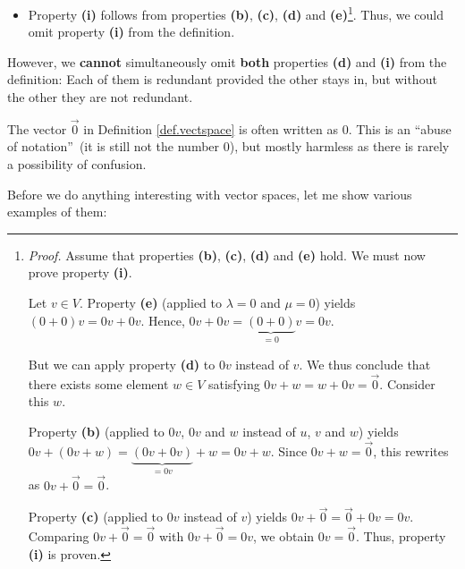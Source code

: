 \documentclass[numbers=enddot,12pt,final,onecolumn,notitlepage]{scrartcl}%
\theoremstyle{definition}
\begin{document}
\begin{itemize}
\item Property \textbf{(i)} follows from properties \textbf{(b)},
\textbf{(c)}, \textbf{(d)} and \textbf{(e)}\footnote{\textit{Proof.} Assume
that properties \textbf{(b)}, \textbf{(c)}, \textbf{(d)} and \textbf{(e)}
hold. We must now prove property \textbf{(i)}.
\par
Let $v\in V$. Property \textbf{(e)} (applied to $\lambda=0$ and $\mu=0$)
yields $\left(  0+0\right)  v=0v+0v$. Hence, $0v+0v=\underbrace{\left(
0+0\right)  }_{=0}v=0v$.
\par
But we can apply property \textbf{(d)} to $0v$ instead of $v$. We thus
conclude that there exists some element $w\in V$ satisfying
$0v+w=w+0v=\overrightarrow{0}$. Consider this $w$.
\par
Property \textbf{(b)} (applied to $0v$, $0v$ and $w$ instead of $u$, $v$ and
$w$) yields $0v+\left(  0v+w\right)  =\underbrace{\left(  0v+0v\right)
}_{=0v}+w=0v+w$. Since $0v+w=\overrightarrow{0}$, this rewrites as
$0v+\overrightarrow{0}=\overrightarrow{0}$.
\par
Property \textbf{(c)} (applied to $0v$ instead of $v$) yields
$0v+\overrightarrow{0}=\overrightarrow{0}+0v=0v$. Comparing
$0v+\overrightarrow{0}=\overrightarrow{0}$ with $0v+\overrightarrow{0}=0v$, we
obtain $0v=\overrightarrow{0}$. Thus, property \textbf{(i)} is proven.}. Thus,
we could omit property \textbf{(i)} from the definition.
\end{itemize}

However, we \textbf{cannot} simultaneously omit \textbf{both} properties
\textbf{(d)} and \textbf{(i)} from the definition: Each of them is redundant
provided the other stays in, but without the other they are not redundant.

The vector $\overrightarrow{0}$ in Definition \ref{def.vectspace} is often
written as $0$. This is an \textquotedblleft abuse of
notation\textquotedblright\ (it is still not the number $0$), but mostly
harmless as there is rarely a possibility of confusion.

Before we do anything interesting with vector spaces, let me show various
examples of them:
\end{document}
